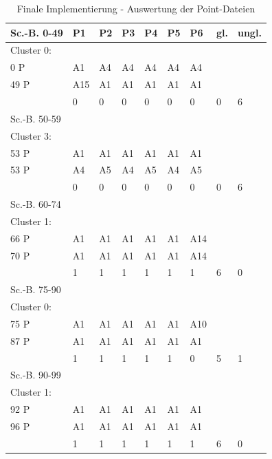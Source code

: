 \begin{table}[h]
    \centering
    \begin{tabular}{|l|l|l|l|l|l|l|l|l|}
    \hline
        Sc.-B. 0-49 & P1 & P2 & P3 & P4 & P5 & P6 & gl. & ungl. \\ \hline
        Cluster 0: & ~ & ~ & ~ & ~ & ~ & ~ & ~ & ~ \\ \hline
             0 P & A1 & A4 & A4 & A4 & A4 & A4 & ~ & ~ \\ \hline
             49 P & A15 & A1 & A1 & A1 & A1 & A1 & ~ & ~ \\ \hline
        ~ & 0 & 0 & 0 & 0 & 0 & 0 & 0 & 6 \\ \hline
        Sc.-B. 50-59 & ~ & ~ & ~ & ~ & ~ & ~ & ~ & ~ \\ \hline
        Cluster 3: & ~ & ~ & ~ & ~ & ~ & ~ & ~ & ~ \\ \hline
          53 P & A1 & A1 & A1 & A1 & A1 & A1 & ~ & ~ \\ \hline
          53 P & A4 & A5 & A4 & A5 & A4 & A5 & ~ & ~ \\ \hline
        ~ & 0 & 0 & 0 & 0 & 0 & 0 & 0 & 6 \\ \hline
        Sc.-B.  60-74 & ~ & ~ & ~ & ~ & ~ & ~ & ~ & ~ \\ \hline
        Cluster 1: & ~ & ~ & ~ & ~ & ~ & ~ & ~ & ~ \\ \hline
          66 P & A1 & A1 & A1 & A1 & A1 & A14 & ~ & ~ \\ \hline
          70 P & A1 & A1 & A1 & A1 & A1 & A14 & ~ & ~ \\ \hline
        ~ & 1 & 1 & 1 & 1 & 1 & 1 & 6 & 0 \\ \hline
        Sc.-B. 75-90 & ~ & ~ & ~ & ~ & ~ & ~ & ~ & ~ \\ \hline
        Cluster 0: & ~ & ~ & ~ & ~ & ~ & ~ & ~ & ~ \\ \hline
          75 P & A1 & A1 & A1 & A1 & A1 & A10 & ~ & ~ \\ \hline
          87 P & A1 & A1 & A1 & A1 & A1 & A1 & ~ & ~ \\ \hline
        ~ & 1 & 1 & 1 & 1 & 1 & 0 & 5 & 1 \\ \hline
        Sc.-B. 90-99 & ~ & ~ & ~ & ~ & ~ & ~ & ~ & ~ \\ \hline
        Cluster 1: & ~ & ~ & ~ & ~ & ~ & ~ & ~ & ~ \\ \hline
          92 P & A1 & A1 & A1 & A1 & A1 & A1 & ~ & ~ \\ \hline
          96 P & A1 & A1 & A1 & A1 & A1 & A1 & ~ & ~ \\ \hline
        ~ & 1 & 1 & 1 & 1 & 1 & 1 & 6 & 0 \\ \hline
    \end{tabular}
	\caption{Finale Implementierung - Auswertung der Point-Dateien}
\label{tab:A-d-PD}
\end{table}

